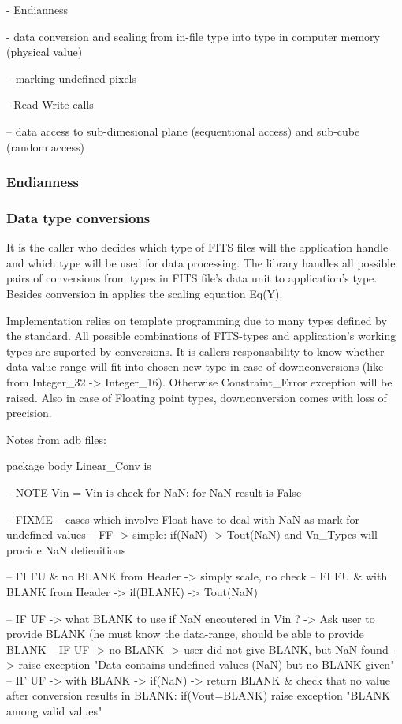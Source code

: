 \documentclass[a4paper,10pt]{article}
\begin{document}
- Endianness

- data conversion and scaling from in-file type into type in computer memory (physical value)

-- marking undefined pixels

- Read Write calls

-- data access to sub-dimesional plane (sequentional access) and sub-cube (random access)



\subsubsection{Endianness}

\subsubsection{Data type conversions}

It is the caller who decides which type of FITS files will the application handle and
which type will be used for data processing. The library handles all possible pairs of
conversions from types in FITS file's data unit to application's type.
Besides conversion in applies the scaling equation Eq(Y).

Implementation relies on template programming due to many types defined by the standard. 
All possible combinations of FITS-types and application's working types are suported
by conversions. It is callers responsability to know whether data value range will fit
into chosen new type in case of downconversions (like from Integer\_32 -> Integer\_16).
Otherwise Constraint\_Error exception will be raised.
Also in case of Floating point types, downconversion comes with loss of precision.

Notes from adb files:

package body Linear\_Conv is

-- NOTE Vin = Vin is check for NaN: for NaN result is False

-- FIXME
    -- cases which involve Float have to deal with NaN as mark for undefined values
    -- FF -> simple: if(NaN) -> Tout(NaN) and Vn\_Types will procide NaN defienitions

    -- FI FU \& no   BLANK from Header -> simply scale, no check
    -- FI FU \& with BLANK from Header -> if(BLANK) -> Tout(NaN)

    -- IF UF -> what BLANK to use if NaN encoutered in Vin ? -> Ask user to provide BLANK (he must know the data-range, should be able to provide BLANK
    -- IF UF -> no   BLANK -> user did not give BLANK, but NaN found -> raise exception "Data contains undefined values (NaN) but no BLANK given"
    -- IF UF -> with BLANK -> if(NaN) -> return BLANK \& check that no value after conversion results in BLANK: if(Vout=BLANK) raise exception "BLANK among valid values"
\end{document}

